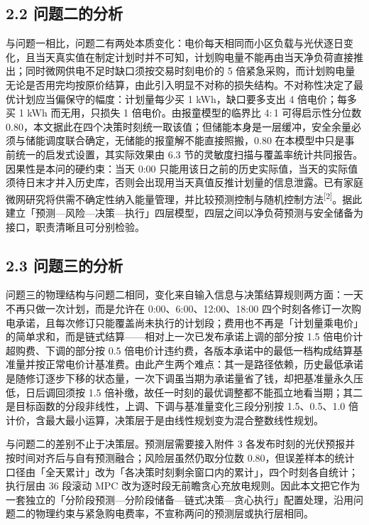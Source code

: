 \documentclass[12pt,a4paper]{ctexart}
\begin{document}
\subsection*{2.2 问题二的分析}

与问题一相比，问题二有两处本质变化：电价每天相同而小区负载与光伏逐日变化，且当天真实值在制定计划时并不可知，计划购电量不能再由当天净负荷直接推出；同时微网供电不足时缺口须按交易时刻电价的 5 倍紧急采购，而计划购电量无论是否用完均按原价结算，由此引入明显不对称的损失结构。不对称性决定了最优计划应当偏保守的幅度：计划量每少买 1 kWh，缺口要多支出 4 倍电价；每多买 1 kWh 而无用，只损失 1 倍电价。由报童模型的临界比 4$:$1 可得启示性分位数 0.80，本文据此在四个决策时刻统一取该值；但储能本身是一层缓冲，安全余量必须与储能调度联合确定，无储能的报童解不能直接照搬，0.80 在本模型中只是事前统一的启发式设置，其实际效果由 6.3 节的灵敏度扫描与覆盖率统计共同报告。因果性是本问的硬约束：当天 0:00 只能用该日之前的历史实际值，当天的实际值须待日末才并入历史库，否则会出现用当天真值反推计划量的信息泄露。已有家庭微网研究将供需不确定性纳入能量管理，并比较预测控制与随机控制方法\textsuperscript{[2]}。据此建立「预测—风险—决策—执行」四层模型，四层之间以净负荷预测与安全储备为接口，职责清晰且可分别检验。

\subsection*{2.3 问题三的分析}

问题三的物理结构与问题二相同，变化来自输入信息与决策结算规则两方面：一天不再只做一次计划，而是允许在 0:00、6:00、12:00、18:00 四个时刻各修订一次购电承诺，且每次修订只能覆盖尚未执行的计划段；费用也不再是「计划量乘电价」的简单求和，而是链式结算——相对上一次已发布承诺上调的部分按 1.5 倍电价计超购费、下调的部分按 0.5 倍电价计违约费，各版本承诺中的最低一档构成结算基准量并按正常电价计基准费。由此产生两个难点：其一是路径依赖，历史最低承诺是随修订逐步下移的状态量，一次下调虽当期为承诺量省了钱，却把基准量永久压低，日后调回须按 1.5 倍补缴，故任一时刻的最优调整都不能孤立地看当期；其二是目标函数的分段非线性，上调、下调与基准量变化三段分别按 1.5、0.5、1.0 倍计价，含最大最小运算，决策层于是由线性规划变为混合整数线性规划。

与问题二的差别不止于决策层。预测层需要接入附件 3 各发布时刻的光伏预报并按时间对齐后与自有预测融合；风险层虽然仍取分位数 0.80，但误差样本的统计口径由「全天累计」改为「各决策时刻剩余窗口内的累计」，四个时刻各自统计；执行层由 36 段滚动 MPC 改为逐时段无前瞻贪心充放电规则。因此本文把它作为一套独立的「分阶段预测—分阶段储备—链式决策—贪心执行」配置处理，沿用问题二的物理约束与紧急购电费率，不宣称两问的预测层或执行层相同。
\end{document}
